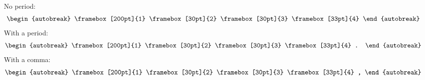 \documentclass{article}
\begin{document}
\begin{minipage}{300pt}
  No period:
  \begin{align}
    \begin{autobreak}
      \framebox[200pt]{1}
      \framebox[30pt]{2}
      \framebox[30pt]{3}
      \framebox[33pt]{4}
    \end{autobreak}
  \end{align}
  With a period:
  \begin{align}
    \begin{autobreak}
      \framebox[200pt]{1}
      \framebox[30pt]{2}
      \framebox[30pt]{3}
      \framebox[33pt]{4}
      .
    \end{autobreak}
  \end{align}
  With a comma:
  \begin{align}
    \begin{autobreak}
      \framebox[200pt]{1}
      \framebox[30pt]{2}
      \framebox[30pt]{3}
      \framebox[33pt]{4}
      ,
    \end{autobreak}
  \end{align}
\end{minipage}
\end{document}
